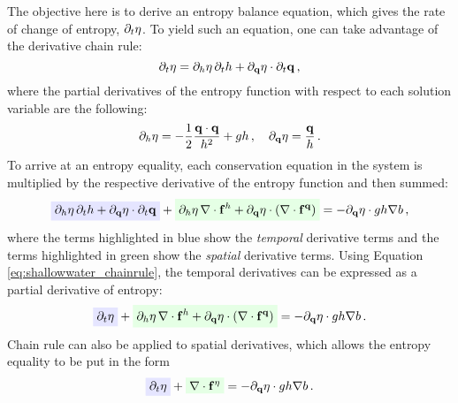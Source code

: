 The objective here is to derive an entropy balance equation, which gives the
rate of change of entropy, $\partial_t\eta$. To yield such an
equation, one can take advantage of the derivative chain rule:
\begin{equation}\label{eq:shallowwater_chainrule}
  \partial_t\eta
  = \partial_h\eta\,\partial_th
  + \partial_{\mathbf{q}}\eta\cdot\partial_t\mathbf{q} \,,
\end{equation}
where the partial derivatives of the entropy function with respect to each
solution variable are the following:
\begin{equation}
  \partial_h\eta
  = -\frac{1}{2}\frac{\mathbf{q}\cdot\mathbf{q}}{h^2}
  + gh \,,
  \quad
  \partial_{\mathbf{q}}\eta = \frac{\mathbf{q}}{h} \,.
\end{equation}
To arrive at an entropy equality, each conservation equation in the system
is multiplied by the respective derivative of the entropy function and then
summed:
\begin{equation}
  \highlightblue{\partial_\height\entropy\,\partial_\timevalue\height
  + \partial_\heightmomentum\entropy\cdot\partial_\timevalue\heightmomentum}
  + \highlightgreen{\partial_\height\entropy\,\divergence
    \mathbf{\consfluxletter}^\height
  + \partial_\heightmomentum\entropy\cdot\pr{\divergence 
    \mathbf{\consfluxletter}^\heightmomentum}}
  = - \partial_\heightmomentum\entropy\cdot\gravity\height\nabla\bathymetry \eqc
\end{equation}
where the terms highlighted in blue show the \emph{temporal} derivative terms
and the terms highlighted in green show the \emph{spatial} derivative terms.
Using Equation \eqref{eq:shallowwater_chainrule}, the temporal derivatives
can be expressed as a partial derivative of entropy:
\begin{equation}
  \highlightblue{\partial_\timevalue\entropy}
  + \highlightgreen{\partial_\height\entropy\,\divergence
    \mathbf{\consfluxletter}^\height
  + \partial_\heightmomentum\entropy\cdot\pr{\divergence
    \mathbf{\consfluxletter}^\heightmomentum}}
  = - \partial_\heightmomentum\entropy\cdot\gravity\height\nabla\bathymetry \eqp
\end{equation}
Chain rule can also be applied to spatial derivatives, which allows the
entropy equality to be put in the form
\begin{equation}\label{eq:shallowwater_entropy_equality}
  \highlightblue{\partial_\timevalue\entropy}
  + \highlightgreen{\divergence\mathbf{\consfluxletter}^\entropy}
  = - \partial_\heightmomentum\entropy\cdot\gravity\height\nabla\bathymetry \eqp
\end{equation}
